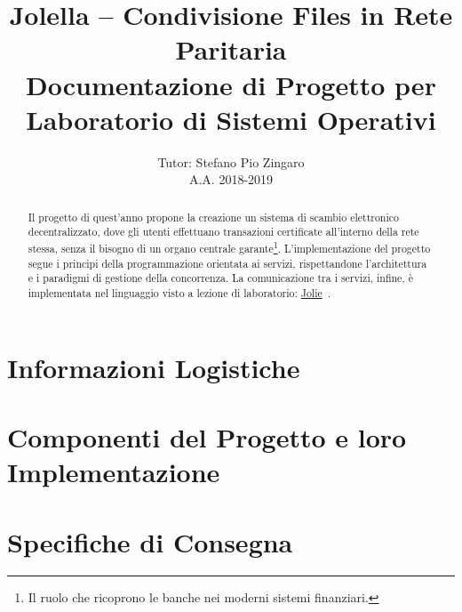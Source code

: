 \documentclass{article}
\title{%
  Jolella -- Condivisione Files in Rete Paritaria\\
  \large Documentazione di Progetto per Laboratorio di Sistemi Operativi}
\author{%
  Tutor: Stefano Pio Zingaro\\
  A.A. 2018-2019}
\begin{document}
\maketitle
\date{}

\begin{abstract}
\noindent Il progetto di quest'anno propone la creazione un sistema di scambio elettronico decentralizzato, dove gli utenti effettuano transazioni certificate all'interno della rete stessa, senza il bisogno di un organo centrale garante\footnote{Il ruolo che ricoprono le banche nei moderni sistemi finanziari.}. L'implementazione del progetto segue i principi della programmazione orientata ai servizi, rispettandone l'architettura e i paradigmi di gestione della concorrenza. La comunicazione tra i servizi, infine, è implementata nel linguaggio visto a lezione di laboratorio: \href{http://jolie-lang.org}{Jolie}~\cite{milner1992calculus}.
\end{abstract}

\newpage

\tableofcontents

\newpage

\section{Informazioni Logistiche}
\label{sec:logistic}


\newpage

\section{Componenti del Progetto e loro Implementazione}
\label{sec:components}


\newpage

\section{Specifiche di Consegna}
\label{sec:delivery}


\newpage



\end{document}
